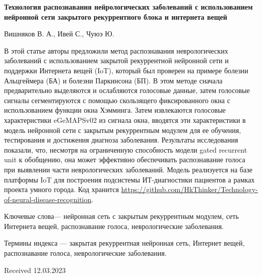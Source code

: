 \documentclass{article}
\begin{document}
\begin{multicols}{2}
\begin{minipage}[t]{0.48\textwidth}
\begin{center}
\textbf{\fontsize{12}{7}\selectfont Технология распознавания нейрологических заболеваний с использованием нейронной сети закрытого рекуррентного блока и интернета вещей}
\end{center}

\begin{center}
\fontsize{12}{7}\selectfont Вишняков В. А., Ивей С., Чуюэ Ю.
\end{center}

\hspace{0.2cm} \fontsize{8}{7}\selectfont В этой статье авторы предложили метод распознавания неврологических заболеваний с использованием закрытой рекуррентной нейронной сети и поддержки Интернета вещей (IoT), который был проверен на примере болезни Альцгеймера (БА) и болезни Паркинсона (БП). В этом методе сначала предварительно выделяются и ослабляются голосовые данные, затем голосовые сигналы сегментируются с помощью скользящего фиксированного окна с использованием функции окна Хэмминга. Затем извлекаются голосовые характеристики eGeMAPSv02 из сигнала окна, вводятся эти характеристики в модель нейронной сети с закрытым рекуррентным модулем для ее обучения, тестирования и достижения диагноза заболевания. Результаты исследования показали, что, несмотря на ограниченную способность модели gated recurrent unit к обобщению, она может эффективно обеспечивать распознавание голоса при выявлении части неврологических заболеваний. Модель реализуется на базе платформы IoT для построения подсистемы ИТ-диагностики пациентов а рамках проекта умного города. Код хранится \url{https://github.com/HkThinker/Technology-of-neural-disease-recognition}.

\hspace{0.2cm}Ключевые слова— нейронная сеть с закрытым рекуррентным модулем, сеть Интернета вещей, распознавание голоса, неврологические заболевания.

\hspace{0.2cm}Термины индекса — закрытая рекуррентная нейронная сеть, Интернет вещей, распознавание голоса, неврологические заболевания.

\begin{flushright}
Received 12.03.2023
\end{flushright}

\setcounter{page}{246}

\end{minipage}
\end{multicols}
\end{document}
